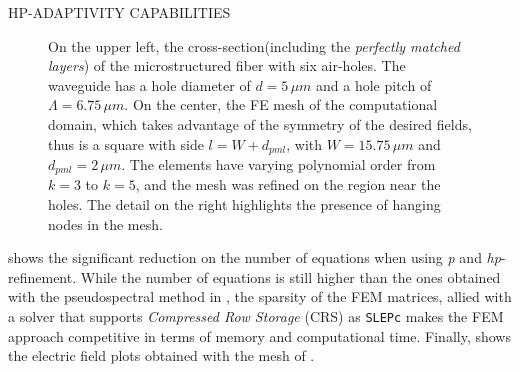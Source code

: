 \documentclass[debug]{beamer} %
\begin{document}
\begin{frame}
\begin{minipage}[t]{0.45\textwidth}
\begin{block}{\boxnumber HP-ADAPTIVITY CAPABILITIES }
\begin{figure}
	    	    \caption{On the upper left, the cross-section(including the \emph{perfectly matched layers}) of the microstructured fiber with six air-holes. The waveguide has a hole diameter of $d = 5\,\mu m$ and a hole pitch of $\Lambda=6.75\,\mu m$. On the center, the FE mesh of the computational domain, which takes advantage of the symmetry of the desired fields, thus is a square with side $l=W+d_{pml}$, with $W=15.75\,\mu m$ and $d_{pml} = 2\, \mu m$. The elements have varying polynomial order from $k=3$ to $k=5$, and the mesh was refined on the region near the holes. The detail on the right highlights the presence of hanging nodes in the mesh.}
	    	    \label{fig:mesh-holey}
	    	\end{figure}    	
			 shows the significant reduction on the number of equations when using \emph{p} and \emph{hp}-refinement. While the number of equations is still higher than the ones obtained with the pseudospectral method in \textcite{chiang11}, the sparsity of the FEM matrices, allied with a solver that supports \emph{Compressed Row Storage} (CRS) as \texttt{SLEPc}\parencite{slepc05} makes the FEM approach competitive in terms of memory and computational time. Finally,  shows the electric field plots obtained with the mesh of .


\end{block}
\end{minipage}
\end{frame}
\end{document}
